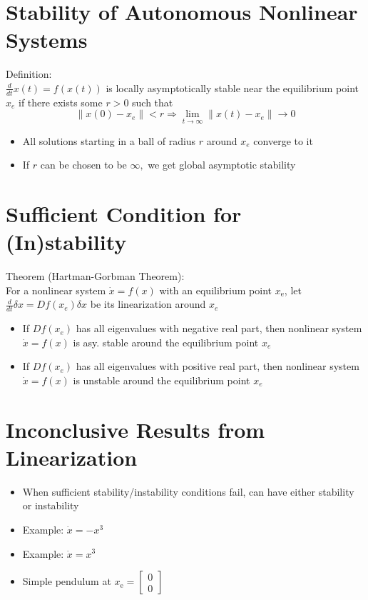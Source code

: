 \documentclass[10pt,a4paper,oneside]{article}
\begin{document}
\section{Stability of Autonomous Nonlinear Systems}
Definition:\\
$\frac{d}{d t} x(t)=f(x(t))$ is locally asymptotically stable near the equilibrium point $x_e$ if there exists some $r>0$ such that
\[
\left\|x(0)-x_{e}\right\|<r \Rightarrow \lim _{t \rightarrow \infty}\left\|x(t)-x_{e}\right\| \rightarrow 0
\]
\begin{itemize}
\item All solutions starting in a ball of radius $r$ around $x_e$ converge to it
\item If $r$ can be chosen to be $\infty,$ we get global asymptotic stability
\end{itemize}
\section{Sufficient Condition for (In)stability}
Theorem (Hartman-Gorbman Theorem):\\
For a nonlinear system $\dot{x}=f(x)$ with an equilibrium point $x_{\mathrm{e}}$, let $\frac{d}{d t} \delta x=D f\left(x_{e}\right) \delta x$ be its linearization around $x_{e}$
\begin{itemize}
\item If $D f\left(x_{e}\right)$ has all eigenvalues with negative real part, then nonlinear system $\dot{x}=f(x)$ is asy. stable around the equilibrium point $x_e$
\item If $D f\left(x_{e}\right)$ has all eigenvalues with positive real part, then nonlinear system $\dot{x}=f(x)$ is unstable around the equilibrium point $x_e$
\end{itemize}
\section{Inconclusive Results from Linearization}
\begin{itemize}
\item When sufficient stability/instability conditions fail, can have either
stability or instability
\item Example: $\dot{x}=-x^{3}$
\item Example: $\dot{x}=x^{3}$
\item Simple pendulum at $x_{\mathrm{e}}=\left[\begin{array}{l}{0} \\ {0}\end{array}\right]$
\end{itemize}
\end{document}
